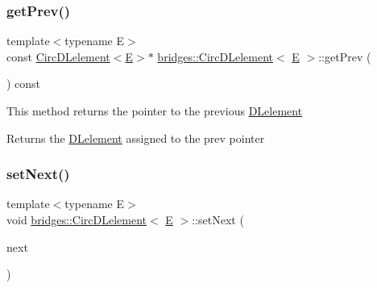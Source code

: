 \subsubsection{\texorpdfstring{getPrev()}{getPrev()}}
{\footnotesize\ttfamily template$<$typename E$>$ \\
const \mbox{\hyperlink{classbridges_1_1_circ_d_lelement}{Circ\+D\+Lelement}}$<$\mbox{\hyperlink{namespacebridges_acfb0a4f7877d8f63de3e6862004c50eda3a3ea00cfc35332cedf6e5e9a32e94da}{E}}$>$$\ast$ \mbox{\hyperlink{classbridges_1_1_circ_d_lelement}{bridges\+::\+Circ\+D\+Lelement}}$<$ \mbox{\hyperlink{namespacebridges_acfb0a4f7877d8f63de3e6862004c50eda3a3ea00cfc35332cedf6e5e9a32e94da}{E}} $>$\+::get\+Prev (\begin{DoxyParamCaption}{ }\end{DoxyParamCaption}) const\hspace{0.3cm}{\ttfamily [inline]}}

This method returns the pointer to the previous \mbox{\hyperlink{classbridges_1_1_d_lelement}{D\+Lelement}} \begin{DoxyReturn}{Returns}
the \mbox{\hyperlink{classbridges_1_1_d_lelement}{D\+Lelement}} assigned to the prev pointer 
\end{DoxyReturn}
\mbox{\label{classbridges_1_1_circ_d_lelement_a0bdf28de82173f2099673d18f6f62810}} 
\subsubsection{\texorpdfstring{setNext()}{setNext()}}
{\footnotesize\ttfamily template$<$typename E$>$ \\
void \mbox{\hyperlink{classbridges_1_1_circ_d_lelement}{bridges\+::\+Circ\+D\+Lelement}}$<$ \mbox{\hyperlink{namespacebridges_acfb0a4f7877d8f63de3e6862004c50eda3a3ea00cfc35332cedf6e5e9a32e94da}{E}} $>$\+::set\+Next (\begin{DoxyParamCaption}\item[{\mbox{\hyperlink{classbridges_1_1_circ_d_lelement}{Circ\+D\+Lelement}}$<$ \mbox{\hyperlink{namespacebridges_acfb0a4f7877d8f63de3e6862004c50eda3a3ea00cfc35332cedf6e5e9a32e94da}{E}} $>$ $\ast$}]{next }\end{DoxyParamCaption})\hspace{0.3cm}{\ttfamily [inline]}}

